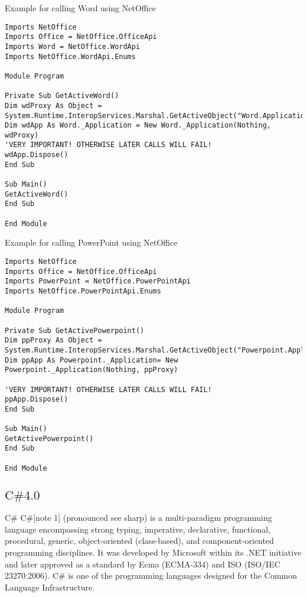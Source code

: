 \noindent Example for calling Word using NetOffice

\begin{lstlisting}
Imports NetOffice
Imports Office = NetOffice.OfficeApi
Imports Word = NetOffice.WordApi
Imports NetOffice.WordApi.Enums

Module Program

Private Sub GetActiveWord()
Dim wdProxy As Object = System.Runtime.InteropServices.Marshal.GetActiveObject("Word.Application")
Dim wdApp As Word._Application = New Word._Application(Nothing, wdProxy)
'VERY IMPORTANT! OTHERWISE LATER CALLS WILL FAIL!
wdApp.Dispose()
End Sub

Sub Main()
GetActiveWord()
End Sub

End Module
\end{lstlisting}



\newpage
\noindent Example for calling PowerPoint using NetOffice

\begin{lstlisting}
Imports NetOffice
Imports Office = NetOffice.OfficeApi
Imports PowerPoint = NetOffice.PowerPointApi
Imports NetOffice.PowerPointApi.Enums

Module Program

Private Sub GetActivePowerpoint()
Dim ppProxy As Object = System.Runtime.InteropServices.Marshal.GetActiveObject("Powerpoint.Application")
Dim ppApp As Powerpoint._Application= New Powerpoint._Application(Nothing, ppProxy)

'VERY IMPORTANT! OTHERWISE LATER CALLS WILL FAIL!
ppApp.Dispose()
End Sub

Sub Main()
GetActivePowerpoint()
End Sub

End Module
\end{lstlisting}




\newpage
\subsection{\texorpdfstring{$\text{C\# 4.0 } $}{CSharp}}
C\#
C\#[note 1] (pronounced see sharp) is a multi-paradigm programming language encompassing strong typing, imperative, declarative, functional, procedural, generic, object-oriented (class-based), and component-oriented programming disciplines. It was developed by Microsoft within its .NET initiative and later approved as a standard by Ecma (ECMA-334) and ISO (ISO/IEC 23270:2006). C\# is one of the programming languages designed for the Common Language Infrastructure.

